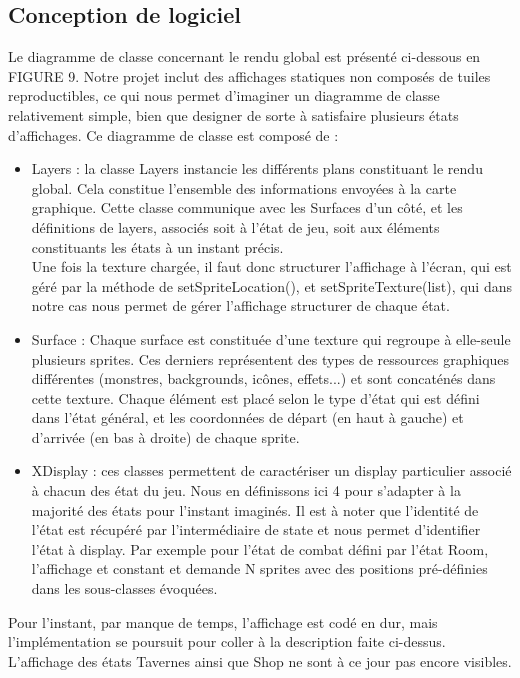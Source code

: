 \documentclass[a4paper,12pt]{article}
\begin{document}
\subsection{Conception de logiciel}
Le diagramme de classe concernant le rendu global est présenté ci-dessous en FIGURE 9. Notre projet inclut des affichages statiques non composés de tuiles reproductibles, ce qui nous permet d'imaginer un diagramme de classe relativement simple, bien que designer de sorte à satisfaire plusieurs états d'affichages. Ce diagramme de classe est composé de : 
\newpage
\begin{itemize}
    \item Layers : la classe Layers instancie les différents plans constituant le rendu global. Cela constitue l'ensemble des informations envoyées à la carte graphique. Cette classe communique avec les Surfaces d'un côté, et les définitions de layers, associés soit à l'état de jeu, soit aux éléments constituants les états à un instant précis. 
    \\ Une fois la texture chargée, il faut donc structurer l'affichage à l'écran, qui est géré par la méthode de setSpriteLocation(), et setSpriteTexture(list), qui dans notre cas nous permet de gérer l'affichage structurer de chaque état. 
    \item Surface : Chaque surface est constituée d'une texture qui regroupe à elle-seule plusieurs sprites. Ces derniers représentent des types de ressources graphiques différentes (monstres, backgrounds, icônes, effets...) et sont concaténés dans cette texture. Chaque élément est placé selon le type d'état qui est défini dans l'état général, et les coordonnées de départ (en haut à gauche) et d'arrivée (en bas à droite) de chaque sprite.
    \item XDisplay : ces classes permettent de caractériser un display particulier associé à chacun des état du jeu. Nous en définissons ici 4 pour s'adapter à la majorité des états pour l'instant imaginés. Il est à noter que l'identité de l'état est récupéré par l'intermédiaire de state et nous permet d'identifier l'état à display. Par exemple pour l'état de combat défini par l'état Room, l'affichage et constant et demande N sprites avec des positions pré-définies dans les sous-classes évoquées.
\end{itemize}
Pour l'instant, par manque de temps, l'affichage est codé en dur, mais l'implémentation se poursuit pour coller à la description faite ci-dessus. L'affichage des états Tavernes ainsi que Shop ne sont à ce jour pas encore visibles. 
\end{document}
